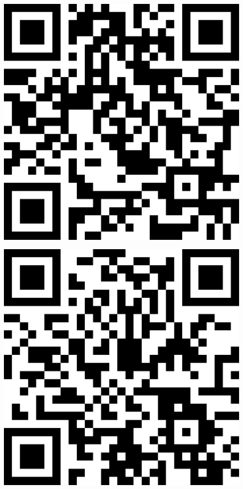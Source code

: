 \documentclass[letterpaper]{article}
\begin{document}
 \endgroup 
 \vspace*{\fill} 
 \pagebreak 
{} 
 \vspace*{\fill} 
 \begingroup 
 \centerline{\includegraphics[scale=1,width=5in,height=5in]{Office3545.png}} 
 \endgroup 
 \vspace*{\fill} 
 \pagebreak 
{} 
 \vspace*{\fill} 
 \begingroup 
 \centerline{\includegraphics[scale=1,width=5in,height=5in]{Office3547.png}} 
\end{document}
